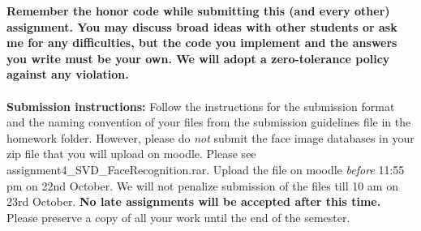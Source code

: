 \documentclass[11pt]{article}
\begin{document}
\maketitle

\textbf{Remember the honor code while submitting this (and every other) assignment. You may discuss broad ideas with other students or ask me for any difficulties, but the code you implement and the answers you write must be your own. We will adopt a \textbf{zero-tolerance policy} against any violation.}
\\
\\
\textbf{Submission instructions:} Follow the instructions for the submission format and the naming convention of your files from the submission guidelines file in the homework folder. However, please do \emph{not} submit the face image databases in your zip file that you will upload on moodle. Please see \textsf{assignment4\_SVD\_FaceRecognition.rar}. Upload the file on moodle \emph{before} 11:55 pm on 22nd October.  We will not penalize submission of the files till 10 am on 23rd October. \textbf{No late assignments will be accepted after this time.} Please preserve a copy of all your work until the end of the semester.  
\end{document}
